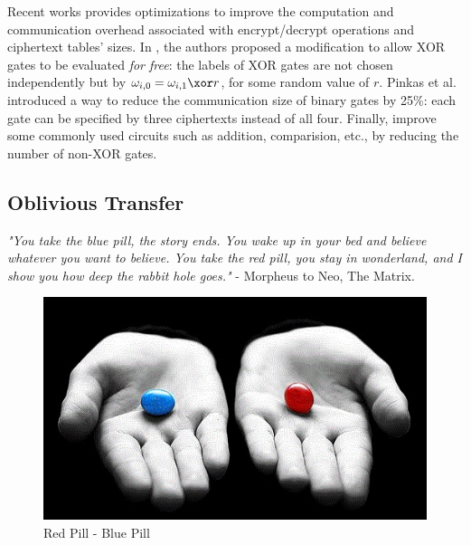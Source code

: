 Recent works provides optimizations to improve the computation and communication
overhead associated with encrypt/decrypt operations and ciphertext tables'
sizes. In \cite{kolesnikov2008improved30}, the authors proposed a modification to
allow XOR gates to be evaluated \textit{for free}: the labels of XOR gates are
not chosen independently but by \(\omega_{i,0} = \omega_{i,1} \xor r\), for some
random value of \(r\). Pinkas et al. \cite{pinkas2009secure38} introduced a way to reduce the communication size of binary gates by 25\%: each gate can be specified by three ciphertexts instead of all four. Finally, \cite{kolesnikov2009improved29} improve some commonly used circuits such as addition, comparision, etc., by reducing the number of non-XOR gates.

\subsection{Oblivious Transfer}
\label{sec:obliviousTransferPre}

\textit{"You take the blue pill, the story ends. You wake up in your bed and
  believe whatever you want to believe. You take the red pill, you stay in
  wonderland, and I show you how deep the rabbit hole goes."} - Morpheus to Neo,
The Matrix.


\begin{figure}[htbp!] 
\centering    
\includegraphics[width=1.0\textwidth]{Chapter2/Figs/Raster/RedPillBluePill}
\caption[Minion]{Red Pill - Blue Pill}
\label{fig:RedPillBluePill}
\end{figure}

